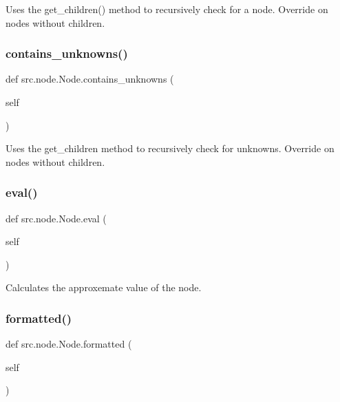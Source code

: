 \begin{DoxyVerb}Uses the get_children() method to recursively check for a node. Override on nodes without children.
\end{DoxyVerb}
 \mbox{\label{classsrc_1_1node_1_1Node_a08d924ae213016952cc4a520a961d945}} 
\subsubsection{\texorpdfstring{contains\+\_\+unknowns()}{contains\_unknowns()}}
{\footnotesize\ttfamily def src.\+node.\+Node.\+contains\+\_\+unknowns (\begin{DoxyParamCaption}\item[{}]{self }\end{DoxyParamCaption})}

\begin{DoxyVerb}Uses the get_children method to recursively check for unknowns. Override on nodes without children.
\end{DoxyVerb}
 \mbox{\label{classsrc_1_1node_1_1Node_af95402801ea0022078ff5adb2f21bcf4}} 
\subsubsection{\texorpdfstring{eval()}{eval()}}
{\footnotesize\ttfamily def src.\+node.\+Node.\+eval (\begin{DoxyParamCaption}\item[{}]{self }\end{DoxyParamCaption})}

\begin{DoxyVerb}Calculates the approxemate value of the node.
\end{DoxyVerb}
 \mbox{\label{classsrc_1_1node_1_1Node_ab8922015ef650c8c490bd57bb247cdb3}} 
\subsubsection{\texorpdfstring{formatted()}{formatted()}}
{\footnotesize\ttfamily def src.\+node.\+Node.\+formatted (\begin{DoxyParamCaption}\item[{}]{self }\end{DoxyParamCaption})}

